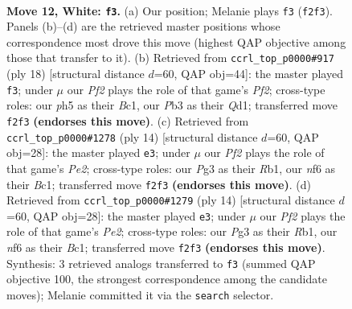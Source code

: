 \documentclass[11pt]{article}
\begin{document}
\begin{figure}[p]
\label{fig:thought-m20}
\end{figure}

\clearpage

\begin{figure}[p]\centering
\begin{subfigure}{0.46\textwidth}\centering
\resizebox{\linewidth}{!}{%
\newchessgame
\chessboard[
  setfen={r1bq1r1k/1p3pb1/2np1np1/p1p1p2p/2P4P/BPN3P1/P2PPPB1/1R1QNRK1 w - - 2 12},
  showmover=false,
  pgfstyle=straightmove, color=movearrow, markmove={f2-f3}
]}
\caption{}
\end{subfigure}\hfill
\begin{subfigure}{0.46\textwidth}\centering
\resizebox{\linewidth}{!}{%
\newchessgame
\chessboard[
  setfen={r1b1k1nr/ppp1q1bp/3p2p1/3Pnp2/2PNp3/2N3P1/PP2PPBP/R1BQ1RK1 w kq - 2 10},
  showmover=false,
  pgfstyle=straightmove, color=movearrow, markmove={f2-f3}
]}
\caption{}
\end{subfigure}
\\[4pt]
\begin{subfigure}{0.46\textwidth}\centering
\resizebox{\linewidth}{!}{%
\newchessgame
\chessboard[
  setfen={r1bqk1nr/1p3pbp/2np2p1/p1p1p3/2P5/P1NP2P1/1P2PPBP/1RBQK1NR w Kkq - 0 8},
  showmover=false,
  pgfstyle=straightmove, color=movearrow, markmove={e2-e3}
]}
\caption{}
\end{subfigure}\hfill
\begin{subfigure}{0.46\textwidth}\centering
\resizebox{\linewidth}{!}{%
\newchessgame
\chessboard[
  setfen={r1bqk1nr/1p3pbp/2np2p1/p1p1p3/2P5/P1NP2P1/1P2PPBP/1RBQK1NR w Kkq - 0 8},
  showmover=false,
  pgfstyle=straightmove, color=movearrow, markmove={e2-e3}
]}
\caption{}
\end{subfigure}
\caption{\textbf{Move 12, White: \texttt{f3}.} (a) Our position; Melanie plays \texttt{f3} (\texttt{f2f3}). Panels (b)--(d) are the retrieved master positions whose correspondence most drove this move (highest QAP objective among those that transfer to it). (b) Retrieved from \texttt{ccrl\_top\_p0000\#917} (ply 18) [structural distance $d$=60, QAP obj=44]: the master played \texttt{f3}; under $\mu$ our \emph{Pf2} plays the role of that game's \emph{Pf2}; cross-type roles: our \emph{p}h5 as their \emph{B}c1, our \emph{P}b3 as their \emph{Q}d1; transferred move \texttt{f2f3} \textbf{(endorses this move)}. (c) Retrieved from \texttt{ccrl\_top\_p0000\#1278} (ply 14) [structural distance $d$=60, QAP obj=28]: the master played \texttt{e3}; under $\mu$ our \emph{Pf2} plays the role of that game's \emph{Pe2}; cross-type roles: our \emph{P}g3 as their \emph{R}b1, our \emph{n}f6 as their \emph{B}c1; transferred move \texttt{f2f3} \textbf{(endorses this move)}. (d) Retrieved from \texttt{ccrl\_top\_p0000\#1279} (ply 14) [structural distance $d$=60, QAP obj=28]: the master played \texttt{e3}; under $\mu$ our \emph{Pf2} plays the role of that game's \emph{Pe2}; cross-type roles: our \emph{P}g3 as their \emph{R}b1, our \emph{n}f6 as their \emph{B}c1; transferred move \texttt{f2f3} \textbf{(endorses this move)}. Synthesis: 3 retrieved analogs transferred to \texttt{f3} (summed QAP objective 100, the strongest correspondence among the candidate moves); Melanie committed it via the \texttt{search} selector.}

\end{figure}
\end{document}
